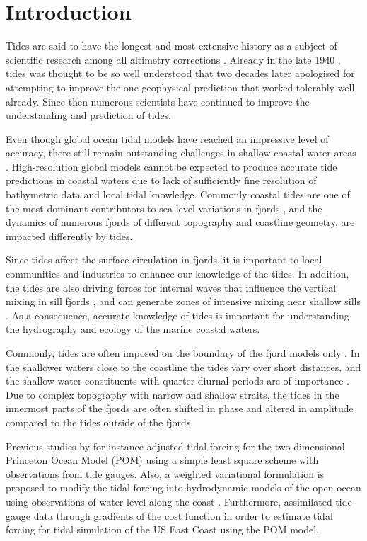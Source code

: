 \section{Introduction}

Tides are said to have the longest and most extensive history as a subject of scientific research among all altimetry corrections \cite[]{egbert94,cartwright77,hendershott81}. 
Already in the late 1940 \citep{unna47}, tides was thought to be so well understood that two decades later \cite{munk66} apologised for attempting to improve the one geophysical prediction that worked tolerably well already. Since then numerous scientists have continued to improve the understanding and prediction of tides. 

Even though global ocean tidal models have reached an impressive level of accuracy, there still remain outstanding challenges in shallow coastal water areas \citep{stammer14}. High-resolution global models cannot be expected to produce accurate tide predictions in coastal waters due to lack of sufficiently fine resolution of bathymetric data and local tidal knowledge. Commonly coastal tides are one of the most dominant contributors to sea level variations in fjords \citep[e.g.][]{grabbe09}, and the dynamics of numerous fjords of different topography and coastline geometry, are impacted differently by tides.

Since tides affect the surface circulation in fjords, it is important to local communities and industries to enhance our knowledge of the tides. In addition, the tides are also driving forces for internal waves that influence the vertical mixing in sill fjords \citep{stigebrandt76,staal16}, and can generate zones of intensive mixing near shallow sills \citep{staal15}. As a consequence, accurate knowledge of tides is important for understanding the hydrography and ecology of the marine coastal waters.

Commonly, tides are often imposed on the boundary of the fjord models only \citep{gjevik89,carniello05,lynge13}. In the shallower waters close to the coastline the tides vary over short distances, and the shallow water constituents with quarter-diurnal periods are of importance \citep[e.g.]{trygg74}. 
Due to complex topography with narrow and shallow straits, the tides in the innermost parts of the fjords are often shifted in phase and altered in amplitude compared to the tides outside of the fjords. 

Previous studies by for instance \cite{chen99} adjusted tidal forcing for the two-dimensional Princeton Ocean Model (POM) using a simple least square scheme with observations from tide gauges. Also, a weighted variational formulation is proposed to modify the tidal forcing into hydrodynamic models of the open ocean using observations of water level along the coast \citep{bennett82}. Furthermore, \cite{zhang03} assimilated tide gauge data through gradients of the cost function in order to estimate tidal forcing for tidal simulation of the US East Coast using the POM model.

